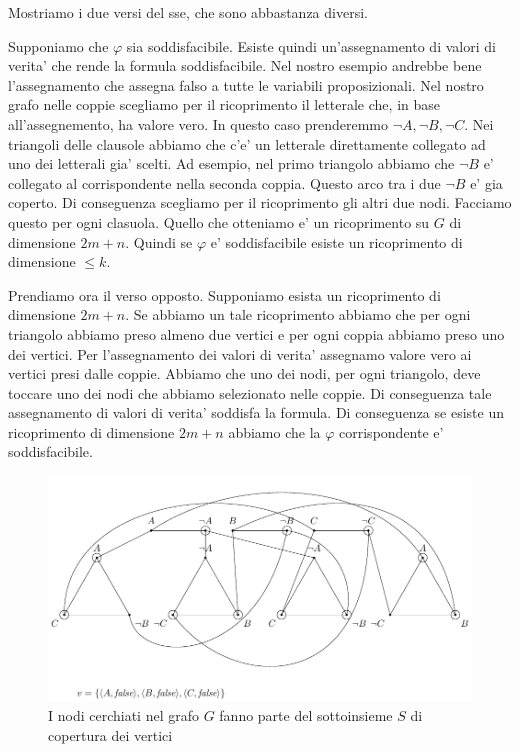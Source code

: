 Mostriamo i due versi del sse, che sono abbastanza diversi.

Supponiamo che $\varphi$ sia soddisfacibile. Esiste quindi un'assegnamento di valori di verita' che
rende la formula soddisfacibile. Nel nostro esempio andrebbe bene l'assegnamento che assegna falso a
tutte le variabili proposizionali. Nel nostro grafo nelle coppie scegliamo per il ricoprimento il
letterale che, in base all'assegnemento, ha valore vero. In questo caso prenderemmo $\lnot A, \lnot
B, \lnot C$. Nei triangoli delle clausole abbiamo che c'e' un letterale direttamente collegato ad
uno dei letterali gia' scelti. Ad esempio, nel primo triangolo abbiamo che $\lnot B$ e' collegato al
corrispondente nella seconda coppia. Questo arco tra i due $\lnot B$ e' gia coperto. Di conseguenza
scegliamo per il ricoprimento gli altri due nodi. Facciamo questo per ogni clasuola. Quello che
otteniamo e' un ricoprimento su $G$ di dimensione $2m + n$. Quindi se $\varphi$ e' soddisfacibile
esiste un ricoprimento di dimensione $\leq k$.

Prendiamo ora il verso opposto. Supponiamo esista un ricoprimento di dimensione $2m + n$. Se abbiamo
un tale ricoprimento abbiamo che per ogni triangolo abbiamo preso almeno due vertici e per ogni
coppia abbiamo preso uno dei vertici. Per l'assegnamento dei valori di verita' assegnamo valore vero
ai vertici presi dalle coppie. Abbiamo che uno dei nodi, per ogni triangolo, deve toccare uno dei
nodi che abbiamo selezionato nelle coppie. Di conseguenza tale assegnamento di valori di verita'
soddisfa la formula. Di conseguenza se esiste un ricoprimento di dimensione $2m + n$ abbiamo che la
$\varphi$ corrispondente e' soddisfacibile.

\begin{figure}[h]
    \begin{center}
        \includegraphics[scale=0.75]{./img/nondeterminism/SATtoVC3.pdf}
        \caption{I nodi cerchiati nel grafo $G$ fanno parte del sottoinsieme $S$ di copertura dei
        vertici}
    \end{center}
\end{figure}

